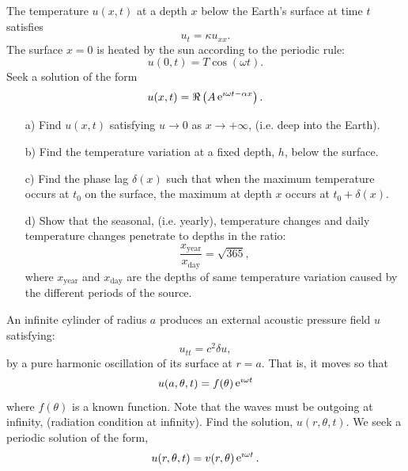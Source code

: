 {%
\begin{Exercise}
  The temperature $u(x,t)$ at a depth $x$ below the Earth's surface
  at time $t$ satisfies 
  \[
  u_t = \kappa u_{x x}.
  \]
  The surface $x = 0$ is heated by the sun according to the periodic rule:
  \[
  u(0,t) = T \cos( \omega t ).
  \]
  Seek a solution of the form
  \[
  u(x,t) = \Re \left( A \mathop{\mathrm{e}}\nolimits^{\imath \omega t - \alpha x} \right).
  \]
  \begin{itemize}
  \item[a)]
    Find $u(x,t)$ satisfying $u \to 0$ as $x \to +\infty$, (i.e. deep into the
    Earth).  
  \item[b)]
    Find the temperature variation at a fixed depth, $h$, below the surface.
  \item[c)]
    Find the phase lag $\delta(x)$ such that when the maximum temperature
    occurs at $t_0$ on the surface, the maximum at depth $x$ occurs at 
    $t_0 + \delta(x)$.
  \item[d)]
    Show that the seasonal, (i.e. yearly), temperature changes and daily 
    temperature changes penetrate to depths in the ratio:
    \[
    \frac{ x_{\mathrm{year}} }{ x_{\mathrm{day}} } = \sqrt{365},
    \]
    where $x_{\mathrm{year}}$ and $x_{\mathrm{day}}$ are the depths of same
    temperature variation caused by the different periods of the source.
  \end{itemize}
\end{Exercise}










\begin{Exercise}
  An infinite cylinder of radius $a$ produces an external acoustic pressure
  field $u$ satisfying:
  \[
  u_{t t} = c^2 \delta u,
  \]
  by a pure harmonic oscillation of its surface at $r = a$.  That is, it moves 
  so that
  \[
  u(a, \theta, t) = f(\theta) \mathop{\mathrm{e}}\nolimits^{\imath \omega t}
  \]
  where $f(\theta)$ is a known function.  Note that the waves must be outgoing
  at infinity, (radiation condition at infinity).  Find the solution, 
  $u(r, \theta, t)$.
  We seek a periodic solution of the form,
  \[
  u(r, \theta, t) = v(r, \theta) \mathop{\mathrm{e}}\nolimits^{\imath \omega t}.
  \]
\end{Exercise}








}
